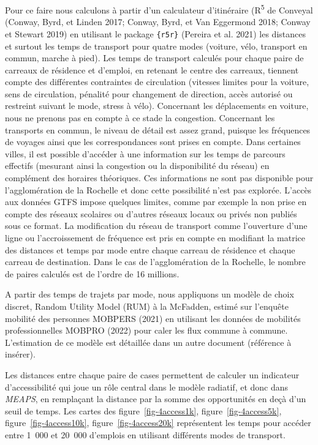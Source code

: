 \documentclass[
  10pt,
  a4paper,
  numbers=noendperiod,
  DIV=9]{scrreprt}
\begin{document}
Pour ce faire nous calculons à partir d'un calculateur d'itinéraire
(R\textsuperscript{5} de Conveyal (Conway, Byrd, et Linden 2017; Conway,
Byrd, et Van Eggermond 2018; Conway et Stewart 2019) en utilisant le
package \texttt{\{r5r\}} (Pereira et al. 2021) les distances et surtout
les temps de transport pour quatre modes (voiture, vélo, transport en
commun, marche à pied). Les temps de transport calculés pour chaque
paire de carreaux de résidence et d'emploi, en retenant le centre des
carreaux, tiennent compte des différentes contraintes de circulation
(vitesses limites pour la voiture, sens de circulation, pénalité pour
changement de direction, accès autorisé ou restreint suivant le mode,
stress à vélo). Concernant les déplacements en voiture, nous ne prenons
pas en compte à ce stade la congestion. Concernant les transports en
commun, le niveau de détail est assez grand, puisque les fréquences de
voyages ainsi que les correspondances sont prises en compte. Dans
certaines villes, il est possible d'accéder à une information sur les
temps de parcours effectifs (mesurant ainsi la congestion ou la
disponibilité du réseau) en complément des horaires théoriques. Ces
informations ne sont pas disponible pour l'agglomération de la Rochelle
et donc cette possibilité n'est pas explorée. L'accès aux données GTFS
impose quelques limites, comme par exemple la non prise en compte des
réseaux scolaires ou d'autres réseaux locaux ou privés non publiés sous
ce format. La modification du réseau de transport comme l'ouverture
d'une ligne ou l'accroissement de fréquence est pris en compte en
modifiant la matrice des distances et temps par mode entre chaque
carreau de résidence et chaque carreau de destination. Dans le cas de
l'agglomération de la Rochelle, le nombre de paires calculés est de
l'ordre de 16 millions.

A partir des temps de trajets par mode, nous appliquons un modèle de
choix discret, Random Utility Model (RUM) à la McFadden, estimé sur
l'enquête mobilité des personnes MOBPERS (2021) en utilisant les données
de mobilités professionnelles MOBPRO (2022) pour caler les flux commune
à commune. L'estimation de ce modèle est détaillée dans un autre
document (référence à insérer).

Les distances entre chaque paire de cases permettent de calculer un
indicateur d'accessibilité qui joue un rôle central dans le modèle
radiatif, et donc dans \emph{MEAPS}, en remplaçant la distance par la
somme des opportunités en deçà d'un seuil de temps. Les cartes des
figure~\ref{fig-4access1k}, figure~\ref{fig-4access5k},
figure~\ref{fig-4access10k}, figure~\ref{fig-4access20k} représentent
les temps pour accéder entre 1~000 et 20~000 d'emplois en utilisant
différents modes de transport.
\end{document}
